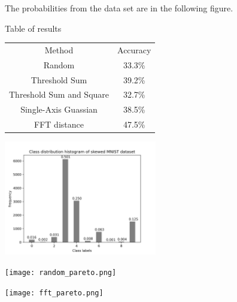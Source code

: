 
The probabilities from the data set are in the following figure.


\begin{center}
    Table of results
    \begin{tabular}{ |c|c| } 
      
     \hline
     Method & Accuracy \\ 
     Random & 33.3\% \\ 
     Threshold Sum & 39.2\% \\ 
     Threshold Sum and Square & 32.7\% \\
     Single-Axis Guassian & 38.5\% \\
     FFT distance & 47.5\% \\
     \hline
     
    \end{tabular}
\end{center}



\begin{center}    
\includegraphics[width=0.5\textwidth]{class_histogram.png}
\end{center}  


\begin{center}
\texttt{[image: random\_pareto.png]}
\end{center}
    

\begin{center}
\texttt{[image: fft\_pareto.png]}
\end{center}
    

